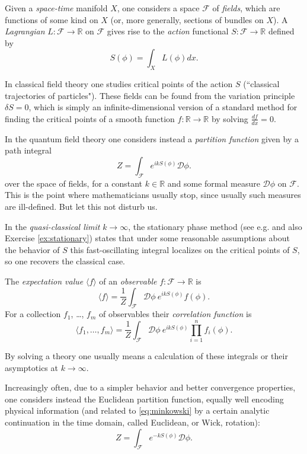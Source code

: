 \documentclass[10pt]{amsart}
\theoremstyle{definition}
\theoremstyle{remark}
\newcommand{\R}{\mathbb R}
\def\<{\langle}
\def\>{\rangle}
\newcommand{\cD}{\mathcal{D}}
\newcommand{\cF}{\mathcal{F}}
\newcommand{\Gd}{\delta}
\newcommand{\Gp}{\phi}
\begin{document}
Given a {\em space-time} manifold $X$, one considers a space $\cF$
of {\em fields}, which are functions of some kind on $X$ (or, more
generally, sections of bundles on $X$).
A {\em Lagrangian} $L:\cF\to\R$ on $\cF$ gives rise to the
{\em action} functional $S:\cF\to\R$ defined by
$$
   S(\Gp)=\int_X L(\Gp)dx.
$$

In classical field theory one studies critical points of the
action $S$ (``classical trajectories of particles"). These fields
can be found from the variation principle $\Gd S=0$, which is simply
an infinite-dimensional version of a standard method for finding
the critical points of a smooth function $f:\R\to\R$ by solving
$\frac{d f}{d x}=0$.

In the quantum field theory one considers instead a {\em partition
function} given by a path integral
\begin{equation}
\label{eq:minkowski}
                 Z=\int_{\cF}e^{ikS(\Gp)}\cD\Gp.
\end{equation}
over the space of fields, for a constant $k\in\R$ and some formal
measure $\cD\Gp$ on $\cF$.
This is the point where mathematicians usually stop, since usually
such measures are ill-defined.
But let this not disturb us.

In the {\em quasi-classical limit} $k\to\infty$, the stationary
phase method (see e.g. \cite{stationary} and also Exercise
\ref{ex:stationary}) states that under some reasonable assumptions
about the behavior of $S$ this fast-oscillating integral localizes
on the critical points of $S$, so one recovers the classical case.


The {\em expectation value} $\<f\>$ of an {\em observable}
$f:\cF\to\R$ is
$$
   \<f\>=\frac1{Z}\int_{\cF}\cD\Gp\ e^{ikS(\Gp)}f(\Gp).
$$
For a collection $f_1$, \dots, $f_m$ of
observables their {\em correlation function} is
$$
   \<f_1,\dots,f_m\>= \frac1{Z}\int_{\cF}\cD\Gp\
       e^{ikS(\Gp)}\prod_{i=1}^n f_i(\Gp).
$$

By solving a theory one usually means a calculation of these
integrals or their asymptotics at $k\to\infty$.

Increasingly often, due to a simpler behavior and better convergence
properties, one considers instead the Euclidean partition function,
equally well encoding physical information (and related to
\eqref{eq:minkowski} by a certain analytic continuation in the time
domain, called Euclidean, or Wick, rotation):
\begin{equation}
\label{eq:euclidean}
Z=\int_{\cF}e^{-kS(\Gp)}\cD\Gp.
\end{equation}
\end{document}
